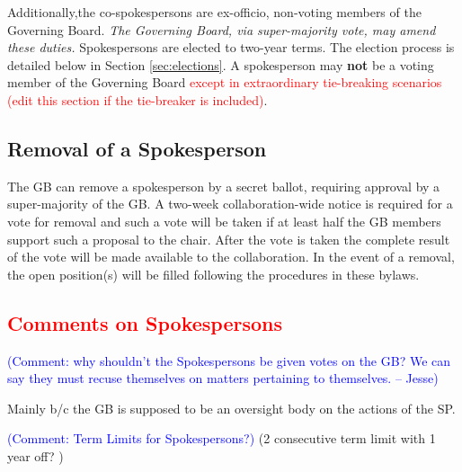 \documentclass[12pt]{article}
\newcommand{\Comment}[1]{\textcolor{Blue}{(Comment: #1)}}
\begin{document}
Additionally,the co-spokespersons are ex-officio, non-voting members of the Governing Board.  \textit{The Governing Board, via super-majority vote, may amend these duties.} 
Spokespersons are elected to two-year terms. The election process is detailed below in Section \ref{sec:elections}. A spokesperson may \textbf{not} be a voting member of the Governing Board \textcolor{red}{except in extraordinary tie-breaking scenarios (edit this section if the tie-breaker is included)}. 




\subsection{Removal of a Spokesperson}

The GB can remove a spokesperson by a secret ballot, requiring approval by a super-majority of the GB. A two-week collaboration-wide notice is required for a vote for removal and such a vote will be taken if at least half the GB members support such a proposal to the chair. After the vote is taken the complete result of the vote will be made available to the collaboration. In the event of a removal, the open position(s) will be filled following the procedures in these bylaws.

\subsection{\textcolor{red}{Comments on Spokespersons}}
\Comment{ why shouldn't the Spokespersons be given votes on the GB? We can say they must recuse themselves on matters pertaining to themselves. -- Jesse}

Mainly b/c the GB is supposed to be an oversight body on the actions of the SP. 

\Comment{Term Limits for Spokespersons?} 
(2 consecutive term limit with 1 year off? ) 

\end{document}
